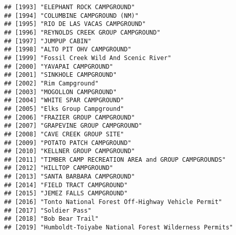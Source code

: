 \documentclass[
]{article}
\begin{document}
\begin{verbatim}
## [1993] "ELEPHANT ROCK CAMPGROUND"                                                            
## [1994] "COLUMBINE CAMPGROUND (NM)"                                                           
## [1995] "RIO DE LAS VACAS CAMPGROUND"                                                         
## [1996] "REYNOLDS CREEK GROUP CAMPGROUND"                                                     
## [1997] "JUMPUP CABIN"                                                                        
## [1998] "ALTO PIT OHV CAMPGROUND"                                                             
## [1999] "Fossil Creek Wild And Scenic River"                                                  
## [2000] "YAVAPAI CAMPGROUND"                                                                  
## [2001] "SINKHOLE CAMPGROUND"                                                                 
## [2002] "Rim Campground"                                                                      
## [2003] "MOGOLLON CAMPGROUND"                                                                 
## [2004] "WHITE SPAR CAMPGROUND"                                                               
## [2005] "Elks Group Campground"                                                               
## [2006] "FRAZIER GROUP CAMPGROUND"                                                            
## [2007] "GRAPEVINE GROUP CAMPGROUND"                                                          
## [2008] "CAVE CREEK GROUP SITE"                                                               
## [2009] "POTATO PATCH CAMPGROUND"                                                             
## [2010] "KELLNER GROUP CAMPGROUND"                                                            
## [2011] "TIMBER CAMP RECREATION AREA and GROUP CAMPGROUNDS"                                   
## [2012] "HILLTOP CAMPGROUND"                                                                  
## [2013] "SANTA BARBARA CAMPGROUND"                                                            
## [2014] "FIELD TRACT CAMPGROUND"                                                              
## [2015] "JEMEZ FALLS CAMPGROUND"                                                              
## [2016] "Tonto National Forest Off-Highway Vehicle Permit"                                    
## [2017] "Soldier Pass"                                                                        
## [2018] "Bob Bear Trail"                                                                      
## [2019] "Humboldt-Toiyabe National Forest Wilderness Permits"                                 

\end{verbatim}
\end{document}
